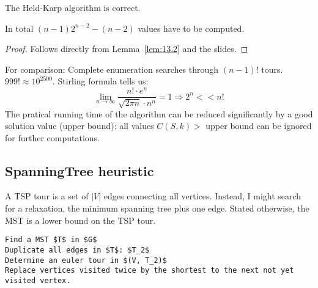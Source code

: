 \begin{thm}
The Held-Karp algorithm is correct.

In total $(n-1) 2^{n-2} - (n-2)$ values have to be computed.
\end{thm}
\begin{proof}
Follows directly from Lemma~\ref{lem:13.2} and the slides.
\end{proof}

For comparison: Complete enumeration searches through $(n-1)!$ tours. $999! \approx 10^{2500}$.
Stirling formula tells us:
\[
\lim_{n \rightarrow \infty} \frac{n! \cdot e^n}{\sqrt{2 \pi n} \cdot n^n} = 1 \Rightarrow 2^n << n!
\]
The pratical running time of the algorithm can be reduced significantly by a good solution value (upper bound):
all values $C(S, k) >$ upper bound can be ignored for further computations.

\subsection*{SpanningTree heuristic}
A TSP tour is a set of $|V|$ edges  connecting all vertices.
Instead, I might search for a relaxation, the minimum spanning tree plus one edge.
Stated otherwise, the MST is a lower bound on the TSP tour.

\begin{lstlisting}[caption=The MST heuristic is therefore]
Find a MST $T$ in $G$
Duplicate all edges in $T$: $T_2$
Determine an euler tour in $(V, T_2)$
Replace vertices visited twice by the shortest to the next not yet visited vertex.
\end{lstlisting}
